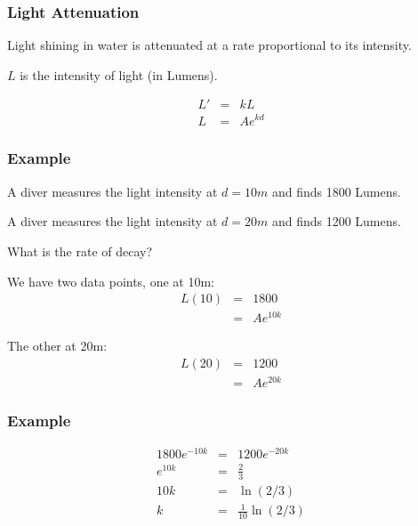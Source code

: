 %
%
%




\begin{frame}
  \frametitle{Light Attenuation}

  Light shining in water is attenuated at a rate proportional to its
  intensity.

  $L$ is the intensity of light (in Lumens).

  \begin{eqnarray*}
    L' & = & k L \\
    L & = & A e^{kd}
  \end{eqnarray*}


\end{frame}

\begin{frame}
  \frametitle{Example}
  
  A diver measures the light intensity at $d=10m$ and finds 1800
  Lumens.

  A diver measures the light intensity at $d=20m$ and finds 1200
  Lumens.

  What is the rate of decay?

  {
    We have two data points, one at 10m:
    \begin{eqnarray*}
      L(10) & = & 1800 \\
      & = & A e^{10k} 
    \end{eqnarray*}


    The other at 20m:
    \begin{eqnarray*}
      L(20) & = & 1200 \\
      & = & A e^{20k}
    \end{eqnarray*}

  }

\end{frame}

\begin{frame}
  \frametitle{Example}

  \begin{eqnarray*}
    1800 e^{-10k} & = & 1200 e^{-20k} \\
    e^{10k} & = & \frac{2}{3} \\
    10k & = & \ln(2/3) \\
    k & = & \frac{1}{10} \ln(2/3)
  \end{eqnarray*}

\end{frame}



